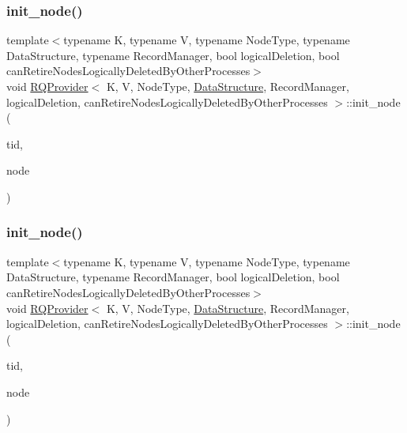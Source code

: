 \mbox{\label{classRQProvider_a2cd517d996a170c029435b638c9cf219}} 
\subsubsection{\texorpdfstring{init\+\_\+node()}{init\_node()}\hspace{0.1cm}{\footnotesize\ttfamily [4/5]}}
{\footnotesize\ttfamily template$<$typename K, typename V, typename Node\+Type, typename Data\+Structure, typename Record\+Manager, bool logical\+Deletion, bool can\+Retire\+Nodes\+Logically\+Deleted\+By\+Other\+Processes$>$ \\
void \hyperlink{classRQProvider}{R\+Q\+Provider}$<$ K, V, Node\+Type, \hyperlink{classDataStructure}{Data\+Structure}, Record\+Manager, logical\+Deletion, can\+Retire\+Nodes\+Logically\+Deleted\+By\+Other\+Processes $>$\+::init\+\_\+node (\begin{DoxyParamCaption}\item[{const int}]{tid,  }\item[{Node\+Type $\ast$const}]{node }\end{DoxyParamCaption})\hspace{0.3cm}{\ttfamily [inline]}}

\mbox{\label{classRQProvider_a2cd517d996a170c029435b638c9cf219}} 
\subsubsection{\texorpdfstring{init\+\_\+node()}{init\_node()}\hspace{0.1cm}{\footnotesize\ttfamily [5/5]}}
{\footnotesize\ttfamily template$<$typename K, typename V, typename Node\+Type, typename Data\+Structure, typename Record\+Manager, bool logical\+Deletion, bool can\+Retire\+Nodes\+Logically\+Deleted\+By\+Other\+Processes$>$ \\
void \hyperlink{classRQProvider}{R\+Q\+Provider}$<$ K, V, Node\+Type, \hyperlink{classDataStructure}{Data\+Structure}, Record\+Manager, logical\+Deletion, can\+Retire\+Nodes\+Logically\+Deleted\+By\+Other\+Processes $>$\+::init\+\_\+node (\begin{DoxyParamCaption}\item[{const int}]{tid,  }\item[{Node\+Type $\ast$const}]{node }\end{DoxyParamCaption})\hspace{0.3cm}{\ttfamily [inline]}}

